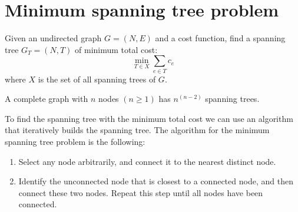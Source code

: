 \documentclass[12pt, a4paper]{report}
\newtheorem[style=M,bodystyle=\normalfont]{proposition}{Proposition}
\newtheorem[style=M,bodystyle=\normalfont]{theorem}{Theorem}
\newtheorem[style=M,bodystyle=\normalfont]{corollary}{Corollary}
\newtheorem[style=M,bodystyle=\normalfont]{lemma}{Lemma}
\newtheorem[style=M,bodystyle=\normalfont]{definition}{Definition}
\begin{document}
    \section{Minimum spanning tree problem}
    Given an undirected graph $G=(N,E)$ and a cost function, find a spanning tree $G_T=(N,T)$ of minimum total cost: 
    \[\min_{T \in X} \sum_{e \in T}c_e\]
    where $X$ is the set of all spanning trees of $G$. 
    \begin{theorem}[Cayley]
        A complete graph with $n$ nodes $(n \geq 1)$ has $n^{(n-2)}$ spanning trees. 
    \end{theorem}
    To find the spanning tree with the minimum total cost we can use an algorithm that iteratively builds the spanning tree. The algorithm for the minimum spanning tree problem
    is the following: 
    \begin{enumerate}
        \item Select any node arbitrarily, and connect it to the nearest distinct node.
        \item Identify the unconnected node that is closest to a connected node, and then connect these two nodes. Repeat this step until all nodes have been connected.
    \end{enumerate}
\end{document}
